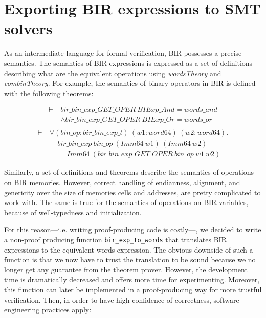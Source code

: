 \documentclass{kththesis}
\begin{document}
{\section{Exporting BIR expressions to SMT solvers} \label{exporting-bir-to-smt}

As an intermediate language for formal verification, \gls{BIR} possesses a precise semantics. The semantics of BIR expressions is expressed as a set of definitions describing what are the equivalent operations using \textit{wordsTheory} and \textit{combinTheory}. For example, the semantics of binary operators in BIR is defined with the following theorems\footnotemark:


\begin{small}
    \begin{equation}
        \begin{split}
            \vdash~&bir\_bin\_exp\_GET\_OPER~BIExp\_And = words\_and\\
                   &\land bir\_bin\_exp\_GET\_OPER~BIExp\_Or = words\_or\\
        \end{split}
        \label{bir_bin_exp_GET_OPER_def}
    \end{equation}
    \begin{equation}
        \begin{split}
            \vdash~&\forall (bin\_op :bir\_bin\_exp\_t)~(w1 :word64)~(w2 :word64).\\
                   &~~~~~bir\_bin\_exp~bin\_op~(Imm64~w1)~(Imm64~w2)\\
                   &~~~~~= Imm64~(bir\_bin\_exp\_GET\_OPER~bin\_op~w1~w2)
        \end{split}
        \label{bir_bin_exp_def}
    \end{equation}
\end{small}

Similarly, a set of definitions and theorems describe the semantics of operations on BIR memories. However, correct handling of endianness, alignment, and genericity over the size of memories cells and addresses, are pretty complicated to work with. The same is true for the semantics of operations on BIR variables, because of well-typedness and initialization.

For this reason---i.e. writing \gls{proof-producing} code is costly---, we decided to write a non-proof producing function \texttt{bir\_exp\_to\_words} that translates BIR expressions to the equivalent words expression. The obvious downside of such a function is that we now have to trust the translation to be sound because we no longer get any guarantee from the theorem prover. However, the development time is dramatically decreased and offers more time for experimenting. Moreover, this function can later be implemented in a proof-producing way for more trustful verification. Then, in order to have high confidence of correctness, software engineering practices apply:

}
\end{document}
